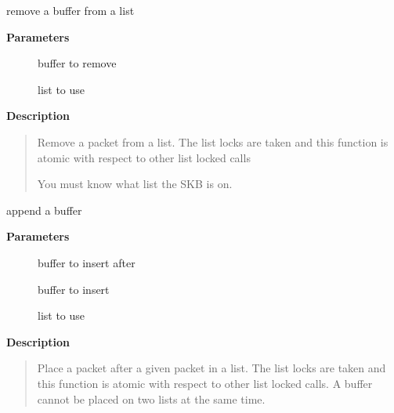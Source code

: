 \documentclass[a4paper,8pt,english]{sphinxmanual}
\begin{document}
\begin{fulllineitems}
\label{networking/kapi:c.skb_unlink}
remove a buffer from a list

\end{fulllineitems}


\textbf{Parameters}
\begin{description}
\item[{}] \leavevmode
buffer to remove

\item[{}] \leavevmode
list to use

\end{description}

\textbf{Description}
\begin{quote}

Remove a packet from a list. The list locks are taken and this
function is atomic with respect to other list locked calls

You must know what list the SKB is on.
\end{quote}

\begin{fulllineitems}
\label{networking/kapi:c.skb_append}
append a buffer

\end{fulllineitems}


\textbf{Parameters}
\begin{description}
\item[{}] \leavevmode
buffer to insert after

\item[{}] \leavevmode
buffer to insert

\item[{}] \leavevmode
list to use

\end{description}

\textbf{Description}
\begin{quote}

Place a packet after a given packet in a list. The list locks are taken
and this function is atomic with respect to other list locked calls.
A buffer cannot be placed on two lists at the same time.
\end{quote}
\end{document}
